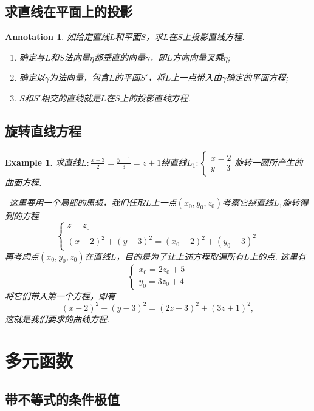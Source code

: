 \documentclass{article}
\newtheorem{example}[theorem]{Example}
\newtheorem{annotation}[theorem]{Annotation}
\newcommand{\hints}{{\color{blue} \text{hints}}}
\begin{document}
\subsection{求直线在平面上的投影}

\begin{annotation}
\rm 如给定直线$L$和平面$S$，求$L$在$S$上投影直线方程. 
\begin{enumerate}
	\item 确定与$L$和$S$法向量$\eta$都垂直的向量$\gamma$，即$L$方向向量叉乘$\eta$; 
	\item 确定以$\gamma$为法向量，包含$L$的平面$S'$，将$L$上一点带入由$\gamma$确定的平面方程;
	\item $S$和$S'$相交的直线就是$L$在$S$上的投影直线方程. 
\end{enumerate}
\end{annotation}


\subsection{旋转直线方程}

\begin{example}
\rm 求直线$L: \frac{x-3}{2} = \frac{y-1}{3} = z+1$绕直线$L_1: \left\{ \begin{array}{ll}
x = 2\\
y = 3 
\end{array}\right.$旋转一圈所产生的曲面方程.

\hints\ 这里要用一个局部的思想，我们任取$L$上一点$(x_0,y_0,z_0)$考察它绕直线$L_1$旋转得到的方程
$$
\left\{
\begin{array}{ll}
z = z_0 \\
(x-2)^2 + (y-3)^2 = (x_0-2)^2 + (y_0-3)^2
\end{array} \right.
$$
再考虑点$(x_0,y_0,z_0)$在直线$L$，目的是为了让上述方程取遍所有$L$上的点. 这里有
$$
\left \{
\begin{array}{ll}
x_0 = 2z_0 + 5\\
y_0 = 3z_0 + 4 
\end{array} \right.
$$
将它们带入第一个方程，即有
$$
(x-2)^2 + (y-3)^2 = (2z+3)^2 + (3z+1)^2,
$$
这就是我们要求的曲线方程. 
\end{example}

\newpage
\section{多元函数}

\subsection{带不等式的条件极值}
\end{document}

